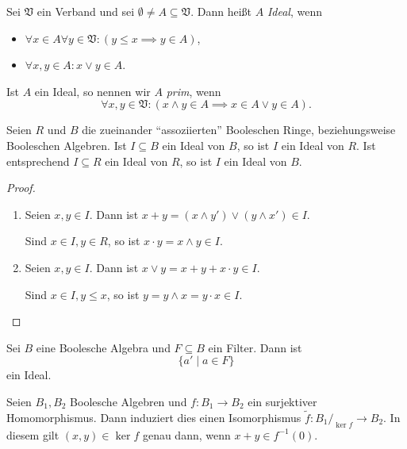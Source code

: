 \begin{definition}
    Sei $\mathfrak{V}$ ein Verband und sei $\emptyset \neq A \subseteq \mathfrak{V}$. Dann heißt $A$ \emph{Ideal}, wenn
    \begin{itemize}
        \item $\forall x \in A \forall y \in \mathfrak{V} : ( y \leq x \implies y \in A )$,
        \item $\forall x, y \in A : x \lor y \in A$.
    \end{itemize}
    Ist $A$ ein Ideal, so nennen wir $A$ \emph{prim}, wenn
    $$ \forall x, y \in \mathfrak{V} : ( x \land y \in A \implies x \in A \lor y \in A ). $$
\end{definition}

\begin{proposition}
    Seien $R$ und $B$ die zueinander ``assoziierten'' Booleschen Ringe, beziehungsweise Booleschen Algebren. Ist $I \subseteq B$ ein Ideal von $B$, so ist $I$ ein Ideal von $R$. Ist entsprechend $I \subseteq R$ ein Ideal von $R$, so ist $I$ ein Ideal von $B$.
\end{proposition}

\begin{proof}{\ }
    \begin{enumerate}
        \item Seien $x, y \in I$. Dann ist $x + y = (x \land y') \lor (y \land x') \in I$.

        Sind $x \in I, y \in R$, so ist $x \cdot y = x \land y \in I$.

        \item Seien $x, y \in I$. Dann ist $x \lor y = x + y + x \cdot y \in I$.
        
        Sind $x \in I, y \leq x$, so ist $y = y \land x = y \cdot x \in I$.
    \end{enumerate}
\end{proof}

\begin{remark}
    Sei $B$ eine Boolesche Algebra und $F \subseteq B$ ein Filter. Dann ist
    $$ \{ a' \mid a \in F \} $$
    ein Ideal.
\end{remark}

\begin{remark}
    Seien $B_1, B_2$ Boolesche Algebren und $f : B_1 \to B_2$ ein surjektiver Homomorphismus. Dann induziert dies einen Isomorphismus $ \widetilde{f} : B_1 /_{\ker f} \to B_2 $. In diesem gilt $(x,y)\in\ker f$ genau dann, wenn $x+y\in f^{-1}({0})$.
\end{remark}

